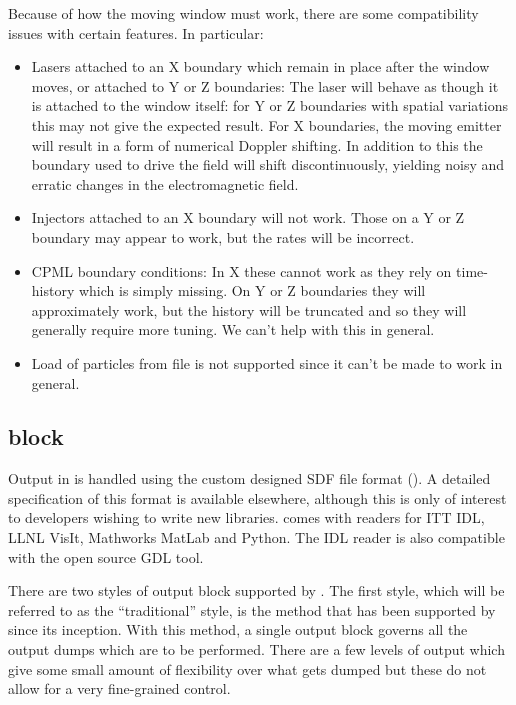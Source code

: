 Because of how the moving window must work, there are some compatibility issues
with certain features. In particular:
\begin{itemize}
\item Lasers attached to an X boundary which remain in place after the window
moves, or attached to Y or Z boundaries:
\subitem The laser will behave as though it is attached to the window itself:
for Y or Z boundaries with spatial variations this may not give the expected
result.
\subitem For X boundaries, the moving emitter will result in a form of
numerical Doppler shifting. In addition to this the boundary used to drive
the field will shift discontinuously, yielding noisy and erratic changes
in the electromagnetic field.
\item Injectors attached to an X boundary will not work. Those on a Y
or Z boundary may appear to work, but the rates will be incorrect.
\item CPML boundary conditions:
\subitem In X these cannot work as they rely on time-history which is
simply missing.
\subitem On Y or Z boundaries they will approximately work, but the history
will be truncated and so they will generally require more tuning.
We can't help with this in general.
\item Load of particles from file is not supported since it can't be made to
work in general.
\end{itemize}

\subsection{\texorpdfstring
  { block}
  {           {output} block}}
\label{sec:output_block}
Output in {\EPOCH} is handled using the custom designed SDF file format
(). A detailed specification of this
format is available elsewhere, although this is only of interest to
developers wishing to write new libraries.
{\EPOCH} comes with readers for ITT IDL, LLNL VisIt, Mathworks MatLab and
Python.
The IDL reader is also compatible with the open source GDL tool.

There are two styles of output block supported by {\EPOCH}. The first
style, which will be referred to as the ``traditional'' style, is the
method that has been supported by {\EPOCH} since its inception. With this
method, a single output block governs all the output dumps which are to be
performed. There are a few levels of output which give some small amount of
flexibility over what gets dumped but these do not allow for a very
fine-grained control.


